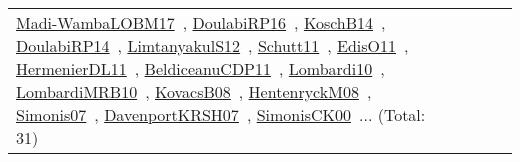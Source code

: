 {\begin{longtable}{lp{3cm}>{\raggedright\arraybackslash}p{6cm}>{\raggedright\arraybackslash}p{6cm}>{\raggedright\arraybackslash}p{8cm}}
\href{works/Madi-WambaLOBM17.pdf}{Madi-WambaLOBM17}~\cite{Madi-WambaLOBM17}, \href{works/DoulabiRP16.pdf}{DoulabiRP16}~\cite{DoulabiRP16}, \href{works/KoschB14.pdf}{KoschB14}~\cite{KoschB14}, \href{works/DoulabiRP14.pdf}{DoulabiRP14}~\cite{DoulabiRP14}, \href{works/LimtanyakulS12.pdf}{LimtanyakulS12}~\cite{LimtanyakulS12}, \href{works/Schutt11.pdf}{Schutt11}~\cite{Schutt11}, \href{works/EdisO11.pdf}{EdisO11}~\cite{EdisO11}, \href{works/HermenierDL11.pdf}{HermenierDL11}~\cite{HermenierDL11}, \href{works/BeldiceanuCDP11.pdf}{BeldiceanuCDP11}~\cite{BeldiceanuCDP11}, \href{works/Lombardi10.pdf}{Lombardi10}~\cite{Lombardi10}, \href{works/LombardiMRB10.pdf}{LombardiMRB10}~\cite{LombardiMRB10}, \href{works/KovacsB08.pdf}{KovacsB08}~\cite{KovacsB08}, \href{works/HentenryckM08.pdf}{HentenryckM08}~\cite{HentenryckM08}, \href{works/Simonis07.pdf}{Simonis07}~\cite{Simonis07}, \href{works/DavenportKRSH07.pdf}{DavenportKRSH07}~\cite{DavenportKRSH07}, \href{works/SimonisCK00.pdf}{SimonisCK00}~\cite{SimonisCK00}... (Total: 31)\\

\end{longtable}}
